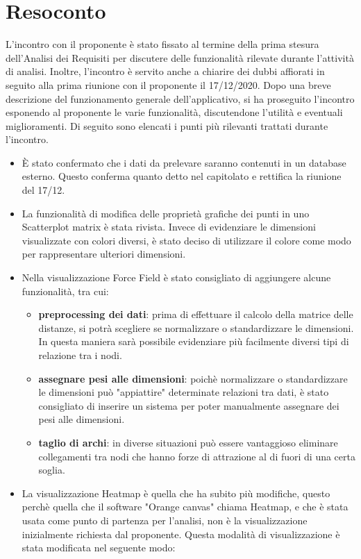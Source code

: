 \documentclass{article}
\begin{document}
\section{Resoconto}
\label{sec:resoconto}

	L'incontro con il proponente è stato fissato al termine della prima stesura dell'Analisi dei Requisiti per discutere delle funzionalità  rilevate durante l'attività di analisi.
	Inoltre, l'incontro è servito anche a chiarire dei dubbi affiorati in seguito alla prima riunione con il proponente il 17/12/2020.
	Dopo una breve descrizione del funzionamento generale dell'applicativo, si ha proseguito l'incontro esponendo al proponente le varie funzionalità, discutendone l'utilità e eventuali miglioramenti.
	Di seguito sono elencati i punti più rilevanti trattati durante l'incontro.
	\begin{itemize}
	    \item È stato confermato che i dati da prelevare saranno contenuti in un database esterno. Questo conferma quanto detto nel capitolato e rettifica la riunione del 17/12.
		\item La funzionalità di modifica delle proprietà grafiche dei punti in uno Scatterplot matrix è stata rivista. Invece di evidenziare le dimensioni visualizzate con colori diversi, è stato deciso di utilizzare il colore come modo per rappresentare ulteriori dimensioni.
		\item Nella visualizzazione Force Field è stato consigliato di aggiungere alcune funzionalità, tra cui:
		\begin {itemize}
		 	\item \textbf{preprocessing dei dati}: prima di effettuare il calcolo della matrice delle distanze, si potrà scegliere se normalizzare o standardizzare le dimensioni. In questa maniera sarà possibile evidenziare più facilmente diversi tipi di relazione tra i nodi.
			\item \textbf{assegnare pesi alle dimensioni}: poichè normalizzare o standardizzare le dimensioni può "appiattire" determinate relazioni tra dati, è stato consigliato di inserire un sistema per poter manualmente assegnare dei pesi alle dimensioni.
			\item \textbf{taglio di archi}: in diverse situazioni può essere vantaggioso eliminare collegamenti tra nodi che hanno forze di attrazione al di fuori di una certa soglia.
		\end {itemize}
		\item La visualizzazione Heatmap è quella che ha subito più modifiche, questo perchè quella che il software "Orange canvas" chiama Heatmap, e che è stata usata come punto di partenza per l'analisi, non è la visualizzazione inizialmente richiesta dal proponente. Questa modalità di visualizzazione è stata modificata nel seguente modo:

\end{itemize}
\end{document}

